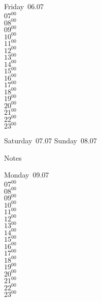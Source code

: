 \documentclass[11pt, a4paper]{book}\usepackage[]{graphicx}\usepackage[]{color}
\begin{document}
\begin{weekdaybox}
  Friday~06.07\\
  { 
  \vfill
  $07^{00}$\\
$08^{00}$\\
$09^{00}$\\
$10^{00}$\\
$11^{00}$\\
$12^{00}$\\
$13^{00}$\\
$14^{00}$\\
$15^{00}$\\
$16^{00}$\\
$17^{00}$\\
$18^{00}$\\
$19^{00}$\\
$20^{00}$\\
$21^{00}$\\
$22^{00}$\\
$23^{00}$\\
  }
\end{weekdaybox}
\begin{weekendbox}
  Saturday~07.07
  \tcblower
  Sunday~08.07
\end{weekendbox} %
\begin{notebox}
  Notes
\end{notebox}
\clearpage
\begin{headerbox}
\end{headerbox}
\begin{weekdaybox}
  Monday~09.07\\
  { 
  \vfill
  $07^{00}$\\
$08^{00}$\\
$09^{00}$\\
$10^{00}$\\
$11^{00}$\\
$12^{00}$\\
$13^{00}$\\
$14^{00}$\\
$15^{00}$\\
$16^{00}$\\
$17^{00}$\\
$18^{00}$\\
$19^{00}$\\
$20^{00}$\\
$21^{00}$\\
$22^{00}$\\
$23^{00}$\\
  }
\end{weekdaybox}
\end{document}
